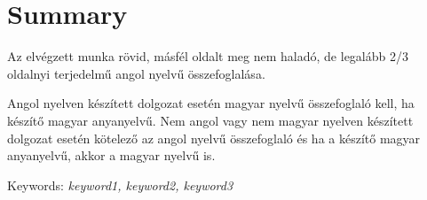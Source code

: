 \chapter*{Summary}

Az elvégzett munka rövid, másfél oldalt meg nem haladó, de legalább 2/3 
oldalnyi terjedelmű angol nyelvű összefoglalása.

Angol nyelven készített dolgozat esetén magyar nyelvű összefoglaló kell, ha
készítő magyar anyanyelvű. Nem angol vagy nem magyar nyelven készített
dolgozat esetén kötelező az angol nyelvű összefoglaló és ha a készítő magyar
anyanyelvű, akkor a magyar nyelvű is.

\vspace{0.5cm}
Keywords: \emph{keyword1, keyword2, keyword3}
\vspace{0.5cm}

